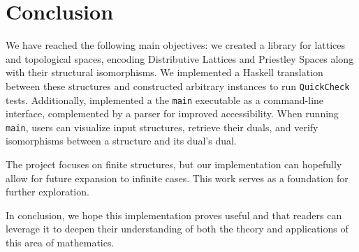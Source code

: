 
\section{Conclusion}\label{sec:Conclusion}

We have reached the following main objectives: we created a library for lattices and topological spaces, encoding Distributive Lattices and Priestley Spaces along with their structural isomorphisms. We implemented a Haskell translation between these structures and constructed arbitrary instances to run \texttt{QuickCheck} tests. Additionally, implemented a the \texttt{main} executable as a command-line interface, complemented by a parser for improved accessibility. When running \texttt{main}, users can visualize input structures, retrieve their duals, and verify isomorphisms between a structure and its dual’s dual.

The project focuses on finite structures, but our implementation can hopefully allow for future expansion to infinite cases. This work serves as a foundation for further exploration.

In conclusion, we hope this implementation proves useful and that readers can leverage it to deepen their understanding of both the theory and applications of this area of mathematics.